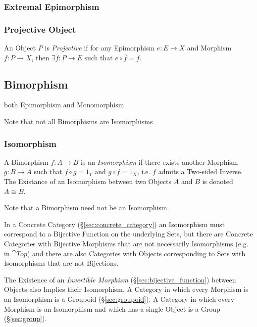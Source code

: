 \subsubsection{Extremal Epimorphism}\label{sec:extremal_epimorphism}

\subsubsection{Projective Object}\label{sec:projective_object}

An Object $P$ is \emph{Projective} if for any Epimorphism $e : E
\rightarrow X$ and Morphism $f : P \rightarrow X$, then $\exists
\overline{f} : P \rightarrow E$ such that $e \circ \overline{f} = f$.



\subsection{Bimorphism}\label{sec:bimorphism}

both Epimorphism and Monomorphism

\fist Note that not all Bimorphisms are Isomorphisms



\subsubsection{Isomorphism}\label{sec:isomorphism}

A Bimorphism $f : A \rightarrow B$ is an \emph{Isomorphism} if there
exists another Morphism $g : B \rightarrow A$ such that $f \circ g =
1_Y$ and $g \circ f = 1_X$, i.e. $f$ admits a Two-sided Inverse. The
Existance of an Isomorphism between two Objects $A$ and $B$ is denoted
$A \cong B$.

\fist Note that a Bimorphism need not be an Isomorphism.

In a Concrete Category (\S\ref{sec:concrete_category}) an Isomorphism
must correspond to a Bijective Function on the underlying Sets, but
there are Concrete Categories with Bijective Morphisms that are not
necessarily Isomorphisms (e.g. in $\cat{Top}$) and there are also
Categories with Objects corresponding to Sets with Isomorphisms that
are not Bijections.

The Existence of an \emph{Invertible Morphism}
(\S\ref{sec:bijective_function}) between Objects also Implies their
Isomorphism. A Category in which every Morphism is an Isomorphism is a
Groupoid (\S\ref{sec:groupoid}). A Category in which every Morphism is
an Isomorphism and which has a single Object is a Group
(\S\ref{sec:group}).

